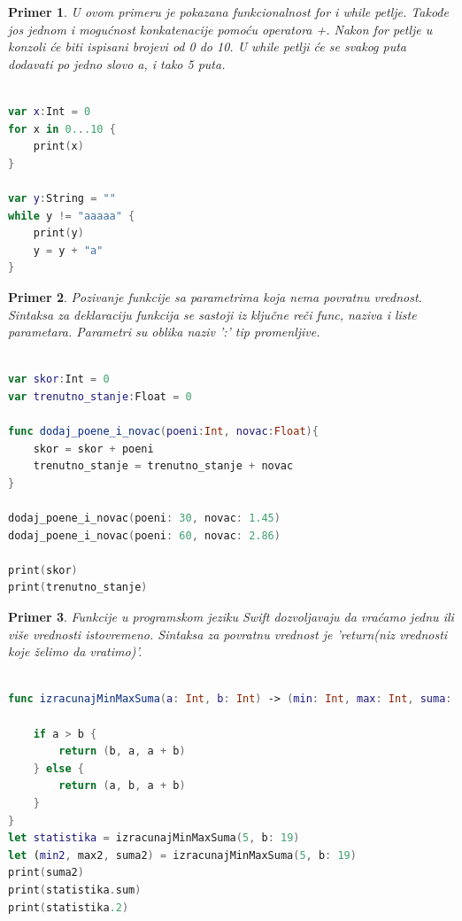 \documentclass[a4paper]{article}
\newtheorem{primer}{Primer}[section]
\begin{document}
\begin{primer}
U ovom primeru je pokazana funkcionalnost for i while petlje. Takođe jos jednom i mogućnost konkatenacije pomoću operatora +. Nakon for petlje u konzoli će biti ispisani brojevi od 0 do 10. U while petlji će se svakog puta dodavati po jedno slovo a, i tako 5 puta.
\end{primer}

\begin{lstlisting}[language=Swift, caption={Petlje},frame=single, label=simple]

var x:Int = 0
for x in 0...10 {
	print(x)
}

var y:String = ""
while y != "aaaaa" {
	print(y)
	y = y + "a"
}

\end{lstlisting}

\begin{primer}
Pozivanje funkcije sa parametrima koja nema povratnu vrednost. Sintaksa za deklaraciju funkcija se sastoji iz ključne reči func, naziva i liste parametara. Parametri su oblika naziv ':' tip promenljive.
\end{primer}

\begin{lstlisting}[language=Swift, caption={Funkcije bez povratne vrednosti},frame=single, label=simple]

var skor:Int = 0
var trenutno_stanje:Float = 0

func dodaj_poene_i_novac(poeni:Int, novac:Float){
	skor = skor + poeni
	trenutno_stanje = trenutno_stanje + novac
}

dodaj_poene_i_novac(poeni: 30, novac: 1.45)
dodaj_poene_i_novac(poeni: 60, novac: 2.86)

print(skor)
print(trenutno_stanje)

\end{lstlisting}

\begin{primer}
Funkcije u programskom jeziku Swift dozvoljavaju da vraćamo jednu ili više vrednosti istovremeno. Sintaksa za povratnu vrednost je 'return(niz vrednosti koje želimo da vratimo)'.
\end{primer}

\begin{lstlisting}[language=Swift, caption={Funkcije koje imaju povratnu vrednost},frame=single, label=simple]

func izracunajMinMaxSuma(a: Int, b: Int) -> (min: Int, max: Int, suma: Int) {
    
    if a > b {
        return (b, a, a + b)
    } else {
        return (a, b, a + b)
    }
}
let statistika = izracunajMinMaxSuma(5, b: 19)
let (min2, max2, suma2) = izracunajMinMaxSuma(5, b: 19)
print(suma2)            
print(statistika.sum)   
print(statistika.2)     

\end{lstlisting}
\end{document}

